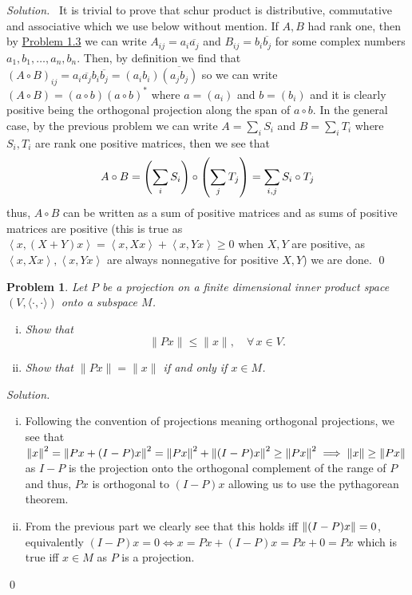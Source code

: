 \documentclass[12pt,a4paper]{article}
\newenvironment{solution}{%
  \par\noindent\textit{Solution.}\ }{\qed}
\theoremstyle{problemstyle}
\newtheorem{problem}{Problem}[section]
\newcommand{\ipp}[1]{\left\langle#1\right\rangle}
\begin{document}
\begin{solution}
	It is trivial to prove that schur product is distributive, commutative and associative which we use below without mention. 
	If $A,B$ had rank one, then by \hyperref[prob:4-3]{Problem 1.3} we can write $A_{ij}=a_i\overline{a_j}$ and $B_{ij}=b_i\overline{b_j}$ for some complex numbers $a_1,b_1,\ldots,a_n,b_n$. 
	Then, by definition we find that $(A\circ B)_{ij}=a_i\overline{a_j}b_i\overline{b_j}=(a_ib_i)\overline{(a_jb_j)}$ so we can write $(A\circ B)=(a\circ b)(a\circ b)^*$ where $a=(a_i)$ and $b=(b_i)$ and it is clearly positive being the orthogonal projection along the span of $a\circ b$. 
	In the general case, by the previous problem we can write $A=\sum_iS_i$ and $B=\sum_iT_i$ where $S_i,T_i$ are rank one positive matrices, then we see that
	\[
		A\circ B=\qty(\sum_i S_i)\circ\qty(\sum_j T_j)=\sum_{i,j}S_i\circ T_j
	\]
thus, $A\circ B$ can be written as a sum of positive matrices and as sums of positive matrices are positive (this is true as $\ipp{x,(X+Y)x}=\ipp{x,Xx}+\ipp{x,Yx}\geq 0$ when $X,Y$ are positive, as $\ipp{x,Xx},\ipp{x,Yx}$ are always nonnegative for positive $X,Y$) we are done. 
\end{solution}
\begin{problem}\label{prob:4-6}
Let $P$ be a projection on a finite dimensional inner product space $(V, \langle \cdot, \cdot \rangle)$ onto a subspace $M$.
\begin{enumerate}[(i)]
    \item Show that
    \[
    \|Px\| \leq \|x\|, \quad \forall\, x \in V.
    \]
    \item Show that $\|Px\| = \|x\|$ if and only if $x \in M$.
\end{enumerate}
\end{problem}
\begin{solution}
	\begin{enumerate}[(i)]
		\item Following the convention of projections meaning orthogonal projections, we see that $\norm{x}^2=\norm{Px+(I-P)x}^2=\norm{Px}^2+\norm{(I-P)x}^2\geq\norm{Px}^2\implies\norm{x}\geq\norm{Px}$ as $I-P$ is the projection onto the orthogonal complement of the range of $P$ and thus, $Px$ is orthogonal to $(I-P)x$ allowing us to use the pythagorean theorem.
		\item From the previous part we clearly see that this holds iff $\norm{(I-P)x}=0$, equivalently $(I-P)x=0\iff x=Px+(I-P)x=Px+0=Px$ which is true iff $x\in M$ as $P$ is a projection.
	\end{enumerate}
\end{solution}
\end{document}
